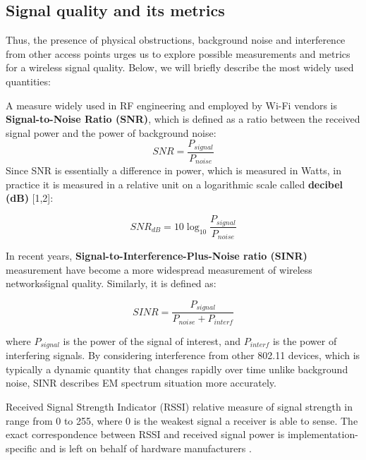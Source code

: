 \subsection{Signal quality and its metrics}

Thus, the presence of physical obstructions, background noise and interference from other access points urges us to explore possible measurements and metrics for a wireless signal quality. Below, we will briefly describe the most widely used quantities:

A measure widely used in RF engineering and employed by Wi-Fi vendors is \textbf{Signal-to-Noise Ratio (SNR)}, which is defined as a ratio between the received signal power and the power of background noise:
\begin{equation}
    \label{formula:snr}
    SNR = \frac{P_{signal}}{P_{noise}}
\end{equation}
    Since SNR is essentially a difference in power, which is measured in Watts, in practice it is measured in a relative unit on a logarithmic scale called \textbf{decibel (dB)} [1,2]:

\begin{equation}
    \label{formula:snr_db}
    {SNR}_{dB} = 10\log_{10}\frac{P_{signal}}{P_{noise}}
\end{equation}

In recent years, \textbf{Signal-to-Interference-Plus-Noise ratio (SINR)} measurement have become a more widespread measurement of wireless networks\' signal quality. Similarly, it is defined as:

\begin{equation}
    \label{formula:sinr}
    SINR = \frac{P_{signal}}{P_{noise} + P_{interf}}
\end{equation}

    where $P_{signal}$ is the power of the signal of interest, and $P_{interf}$ is the power of interfering signals.
    By considering interference from other 802.11 devices, which is typically a dynamic quantity that changes rapidly over time unlike background noise, SINR describes EM spectrum situation more accurately.

Received Signal Strength Indicator (RSSI) relative measure of signal strength in range from 0 to 255, where 0 is the weakest signal a receiver is able to sense. The exact correspondence between RSSI and received signal power is implementation-specific and is left on behalf of hardware manufacturers \cite{colemanCWNACertifiedWireless2021}.

